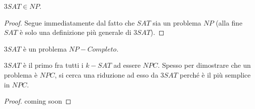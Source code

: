 \vspace{0.4cm}

\begin{lemm}
  $3SAT \in NP$.
\end{lemm}

\begin{proof}
	Segue immediatamente dal fatto che $SAT$ sia un problema $NP$ (alla fine $SAT$ è solo una definizione più generale di $3SAT$).
\end{proof}

\vspace{0.4cm}

\begin{lemm}
	$3SAT$ è un problema $NP-Completo$. 
\end{lemm}

\begin{remark}
	$3SAT$ è il primo fra tutti i $k-SAT$ ad essere $NPC$. Spesso per dimostrare che un problema è $NPC$, si cerca una riduzione ad esso da $3SAT$ perché è il più semplice in $NPC$. 
\end{remark}

\begin{proof}
	coming soon
\end{proof}
